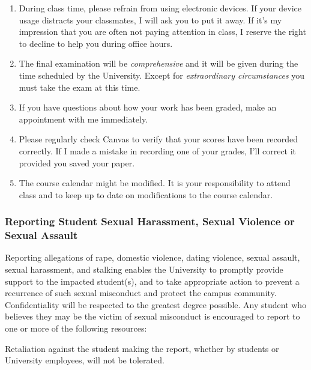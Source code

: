 \documentclass[12pt]{article}
\newcounter{ex}\setcounter{ex}{0}
\renewenvironment{description}[0]{\begin{compactdesc}}{\end{compactdesc}}
\begin{document}
\begin{enumerate}
\item During class time, please refrain from using electronic devices. If your 
device usage distracts your classmates, I will ask you to put it away. If it's my 
impression that you are often not paying attention in class, I reserve the right to 
decline to help you during office hours.

\item The final examination will be \emph{comprehensive} and it will be given 
during the  time scheduled by the University. Except for \emph{extraordinary circumstances}
you must take the exam at this time.
 
\item If you have questions about how your work has been graded, make an appointment with me immediately.


\item Please regularly check Canvas  to verify that your scores have 
been recorded correctly.  If I made a mistake in recording one of
your grades, I'll correct it provided you saved your paper.

\item The course calendar might be modified. It is your responsibility to attend
class and to keep up to date on modifications to the course calendar.

\end{enumerate}

\newpage

\subsubsection*{Reporting Student Sexual Harassment, Sexual Violence or Sexual Assault}

Reporting allegations of rape, domestic violence, dating violence, sexual assault, sexual harassment, and stalking enables the University to promptly provide support to the impacted student(s), and to take appropriate action to prevent a recurrence of such sexual misconduct and protect the campus community. Confidentiality will be respected to the greatest degree possible. Any student who believes they may be the victim of sexual misconduct is encouraged to report to one or more of the following resources:
\begin{description}
    \item[Local Domestic Violence, Sexual Assault Advocacy Agency]

    \item[Campus Police (or Security)]
    
    \item[Title IX Coordinator]

\end{description}
Retaliation against the student making the report, whether by students or University employees, will not be tolerated.
\end{document}
